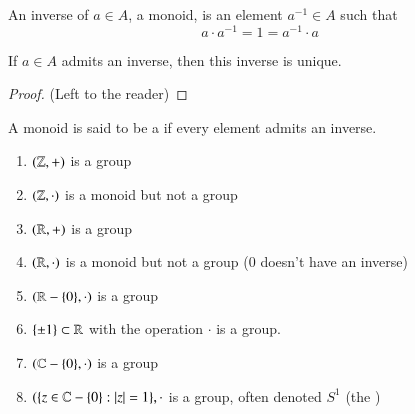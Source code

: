 \documentclass[12pt, a4paper, oneside, openright, titlepage]{book}
\begin{document}
\begin{appendices}
    \begin{defn}
        An inverse of $a \in A$, a monoid, is an element $a^{-1} \in A$ such that \begin{equation}
            a\cdot a^{-1} = 1 = a^{-1} \cdot a
        \end{equation}
    \end{defn}
    
    \begin{lem}
        If $a \in A$ admits an inverse, then this inverse is unique.
        \begin{proof}
            (Left to the reader)
        \end{proof}
    \end{lem}
    
    \begin{defn}
        A monoid is said to be a  if every element admits an inverse.
    \end{defn}
    
    \begin{eg}
        \leavevmode
        \begin{enumerate}
            \item $(\mathbb Z,+)$ is a group
            \item $(\mathbb Z,\cdot)$ is a monoid but not a group
            \item $(\mathbb R,+)$ is a group
            \item $(\mathbb R,\cdot)$ is a monoid but not a group ($0$ doesn't have an inverse)
            \item $(\mathbb R-\{0\},\cdot)$ is a group
            \item $\{\pm 1\} \subset \mathbb R$ with the operation $\cdot$ is a group.
            \item $(\mathbb C-\{0\},\cdot)$ is a group
            \item $(\{z\in \mathbb C-\{0\}:|z| = 1\},\cdot$ is a group, often denoted $S^1$ (the )
        \end{enumerate}
    \end{eg}
    

\end{appendices}
\end{document}
